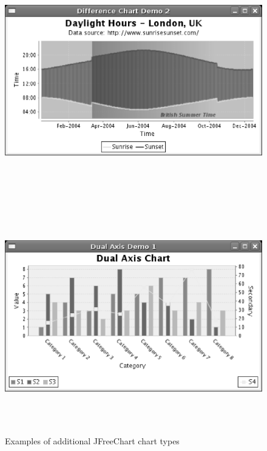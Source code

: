 \documentclass[project]{bsu-ms}
\begin{document}
\begin{figure}[ht]
\begin{center}
\includegraphics*[width=6.0in,height=4.0in,keepaspectratio]{fig3a.eps}
\end{center}
\begin{center}
\includegraphics*[width=6.0in,height=4.0in,keepaspectratio]{fig3b.eps}
\end{center}
\caption{Examples of additional JFreeChart chart types}
\label{fig:samples}
\end{figure}
\end{document}
